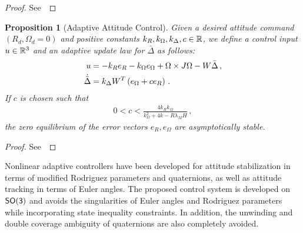 \documentclass[letterpaper, 10 pt, conference]{ieeeconf}  %
\newtheorem{prop}{Proposition}
\begin{document}
\begin{proof}
See~
\end{proof}
\begin{prop}[Adaptive Attitude Control]\label{prop:adaptive_control}
Given  a desired attitude command \( (R_d, \Omega_d = 0 )\) and positive constants \( k_R, k_\Omega, k_\Delta, c \in \mathbb{R} \), we define a control input \( u \in \mathbb{R}^3\) and an adaptive update law for \( \bar{\Delta} \) as follows:
\begin{align}
	u &= - k_R e_R - k_\Omega e_\Omega + \Omega \times J \Omega - W \bar{\Delta} \, , \label{eqn:adaptive_control} \\
	\dot{\bar{\Delta}} &= k_\Delta W^T \left( e_\Omega + c e_R \right) \, . \label{eqn:delta_dot}
\end{align}
If \( c \) is chosen such that
\begin{gather}
	0 < c < \frac{4 k_R k_\Omega}{k_\Omega^2 + 4 k-R \lambda_M H} \, , \label{eqn:c_bound}
\end{gather}
  the zero equilibrium of the error vectors \( e_R, e_\Omega\) are asymptotically stable.
\end{prop}
\begin{proof}
See~
\end{proof}

Nonlinear adaptive controllers have been developed for attitude stabilization in terms of modified Rodriguez parameters and quaternions, as well as attitude tracking in terms of Euler angles. 
The proposed control system is developed on \(\mathsf{SO(3)}\) and avoids the singularities of Euler angles and Rodriguez parameters while incorporating state inequality constraints. 
In addition, the unwinding and double coverage ambiguity of quaternions are also completely avoided. 
\end{document}
